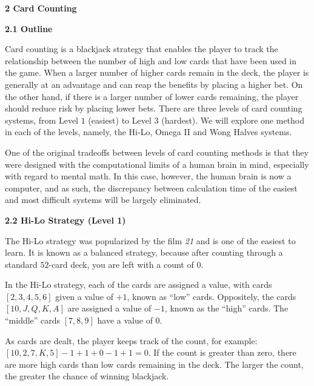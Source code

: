 \documentclass[12pt]{article}
\begin{document}
    {\large \textbf{2 Card Counting}} \newline

    \textbf{2.1 Outline} \newline

    Card counting is a blackjack strategy that enables the player to track the relationship between the number of high and low cards that have been used in the game. When a larger number of higher cards remain in the deck, the player is generally at an advantage and can reap the benefits by placing a higher bet. On the other hand, if there is a larger number of lower cards remaining, the player should reduce risk by placing lower bets. There are three levels of card counting systems, from Level $1$ (easiest) to Level $3$ (hardest). We will explore one method in each of the levels, namely, the Hi-Lo, Omega II and Wong Halves systems. \newline

	One of the original tradeoffs between levels of card counting methods is that they were designed with the computational limits of a human brain in mind, especially with regard to mental math. In this case, however, the human brain is now a computer, and as such, the discrepancy between calculation time of the easiest and most difficult systems will be largely eliminated. \newline

	\textbf{2.2 Hi-Lo Strategy (Level 1)} \newline

    The Hi-Lo strategy was popularized by the film \textit{21} and is one of the easiest to learn. It is known as a balanced strategy, because after counting through a standard $52$-card deck, you are left with a count of $0$. \newline

    In the Hi-Lo strategy, each of the cards are assigned a value, with cards $[2, 3, 4, 5, 6]$ given a value of $+1$, known as ``low'' cards. Oppositely, the cards $[10, J, Q, K, A]$ are assigned a value of $-1$, known as the ``high'' cards. The ``middle'' cards $[7, 8, 9]$ have a value of 0. \newline

	As cards are dealt, the player keeps track of the count, for example: $[10, 2, 7, K, 5]  -1 + 1 + 0 - 1 + 1 = 0$. If the count is greater than zero, there are more high cards than low cards remaining in the deck. The larger the count, the greater the chance of winning blackjack. \newline
\end{document}
